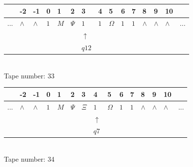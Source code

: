 \documentclass[11pt]{article}
\begin{document}
\begin{table}[H]
\centering
\begin{tabular}{lllllllllllllll}
 & -2 & -1 & 0 & 1 & 2 & 3 & 4 & 5 & 6 & 7 & 8 & 9 & 10 & \\
\hline
$...$ & \multicolumn{1}{|l|}{$\wedge$} & \multicolumn{1}{|l|}{$\wedge$} & \multicolumn{1}{|l|}{$1$} & \multicolumn{1}{|l|}{$M$} & \multicolumn{1}{|l|}{$\Psi$} & \multicolumn{1}{|l|}{$1$} & \multicolumn{1}{|l|}{$1$} & \multicolumn{1}{|l|}{$\Omega$} & \multicolumn{1}{|l|}{$1$} & \multicolumn{1}{|l|}{$1$} & \multicolumn{1}{|l|}{$\wedge$} & \multicolumn{1}{|l|}{$\wedge$} & \multicolumn{1}{|l|}{$\wedge$} & $...$\\
\hline
&  &  &  &  &  & $\uparrow$ &  &  &  &  &  &  &  &  \\
&  &  &  &  &  & $ q12 $ &  &  &  &  &  &  &  &  \\
\end{tabular}
\\
Tape number: 33
\noindent\makebox[\linewidth]{\hdashrule{\textwidth}{1pt}{1pt}}\end{table}

\begin{table}[H]
\centering
\begin{tabular}{lllllllllllllll}
 & -2 & -1 & 0 & 1 & 2 & 3 & 4 & 5 & 6 & 7 & 8 & 9 & 10 & \\
\hline
$...$ & \multicolumn{1}{|l|}{$\wedge$} & \multicolumn{1}{|l|}{$\wedge$} & \multicolumn{1}{|l|}{$1$} & \multicolumn{1}{|l|}{$M$} & \multicolumn{1}{|l|}{$\Psi$} & \multicolumn{1}{|l|}{$\Xi$} & \multicolumn{1}{|l|}{$1$} & \multicolumn{1}{|l|}{$\Omega$} & \multicolumn{1}{|l|}{$1$} & \multicolumn{1}{|l|}{$1$} & \multicolumn{1}{|l|}{$\wedge$} & \multicolumn{1}{|l|}{$\wedge$} & \multicolumn{1}{|l|}{$\wedge$} & $...$\\
\hline
&  &  &  &  &  &  & $\uparrow$ &  &  &  &  &  &  &  \\
&  &  &  &  &  &  & $ q7 $ &  &  &  &  &  &  &  \\
\end{tabular}
\\
Tape number: 34
\noindent\makebox[\linewidth]{\hdashrule{\textwidth}{1pt}{1pt}}\end{table}
\end{document}
